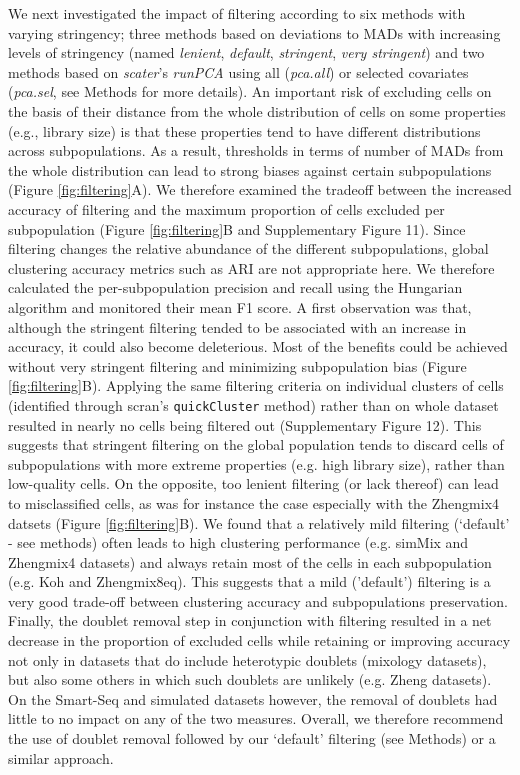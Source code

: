\documentclass{bmcart}
\begin{document}
We next investigated the impact of filtering according to six methods with varying stringency; three methods based on deviations to MADs with increasing levels of stringency (named \textit{lenient}, \textit{default}, \textit{stringent}, \textit{very stringent}) and two methods based on \textit{scater}'s \textit{runPCA} using all (\textit{pca.all}) or selected covariates (\textit{pca.sel}, see Methods for more details). An important risk of excluding cells on the basis of their distance from the whole distribution of cells on some properties (e.g., library size) is that these properties tend to have different distributions across subpopulations. As a result, thresholds in terms of number of MADs from the whole distribution can lead to strong biases against certain subpopulations (Figure \ref{fig:filtering}A). We therefore examined the tradeoff between the increased accuracy of filtering and the maximum proportion of cells excluded per subpopulation (Figure \ref{fig:filtering}B and Supplementary Figure 11). Since filtering changes the relative abundance of the different subpopulations, global clustering accuracy metrics such as ARI are not appropriate here. We therefore calculated the per-subpopulation precision and recall using the Hungarian algorithm \cite{PapadimitriouHu1998} and monitored their mean F1 score. A first observation was that, although the stringent filtering tended to be associated with an increase in accuracy, it could also become deleterious. Most of the benefits could be achieved without very stringent filtering and minimizing subpopulation bias (Figure \ref{fig:filtering}B). Applying the same filtering criteria on individual clusters of cells (identified through scran's \texttt{quickCluster} method) rather than on whole dataset resulted in nearly no cells being filtered out (Supplementary Figure 12). This suggests that stringent filtering on the global population tends to discard cells of subpopulations with more extreme properties (e.g. high library size), rather than low-quality cells. On the opposite, too lenient filtering (or lack thereof) can lead to misclassified cells, as was for instance the case especially with the Zhengmix4 datsets (Figure \ref{fig:filtering}B). We found that a relatively mild filtering (`default' - see methods) often leads to high clustering performance (e.g. simMix and Zhengmix4 datasets) and always retain most of the cells in each subpopulation (e.g. Koh and Zhengmix8eq). This suggests that a mild ('default') filtering is a very good trade-off between clustering accuracy and subpopulations preservation.  Finally, the doublet removal step in conjunction with filtering  resulted in a net decrease in the proportion of excluded cells while retaining or improving accuracy not only in datasets that do include heterotypic doublets (mixology datasets), but also some others in which such doublets are unlikely (e.g. Zheng datasets). On the Smart-Seq and simulated datasets however, the removal of doublets had little to no impact on any of the two measures. Overall, we therefore recommend the use of doublet removal followed by our `default' filtering (see Methods) or a similar approach.
\end{document}
